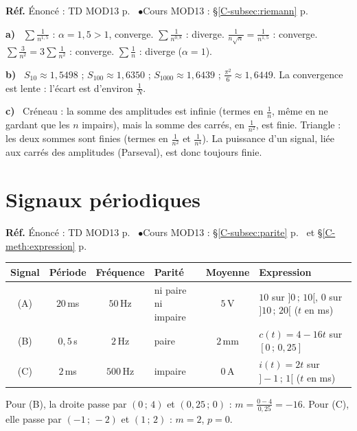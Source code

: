 \documentclass[a4paper,11pt]{article}
\newcommand{\cours}[1]{§\ref{C-#1} p.~\pageref{C-#1}}
\newcommand{\source}[2]{{\footnotesize\color{uimmgray}\textbf{Réf.} \enspace Énoncé : TD MOD13 p.~\pageref{T-#1} \enspace$\bullet$\enspace Cours MOD13 : #2}\par\smallskip}
\newcommand{\q}[1]{\textbf{\color{uimmblue}#1}\ }
\begin{document}
\begin{correction}
\source{exo:3}{\cours{subsec:riemann}}
\q{a)} $\sum\frac1{n^{1{,}5}}$ : $\alpha = 1{,}5 > 1$, converge. \quad $\sum\frac1{n^{0{,}8}}$ : diverge. \quad $\frac1{n\sqrt n} = \frac1{n^{1{,}5}}$ : converge. \quad $\sum\frac3{n^2} = 3\sum\frac1{n^2}$ : converge. \quad $\sum\frac1n$ : diverge ($\alpha = 1$).

\q{b)} $S_{10}\approx 1{,}5498$ ; $S_{100}\approx 1{,}6350$ ; $S_{1000}\approx 1{,}6439$ ; $\frac{\pi^2}{6}\approx 1{,}6449$. La convergence est lente : l'écart est d'environ $\frac1N$.

\q{c)} Créneau : la somme des amplitudes est infinie (termes en $\frac1n$, même en ne gardant que les $n$ impairs), mais la somme des carrés, en $\frac1{n^2}$, est finie. Triangle : les deux sommes sont finies (termes en $\frac1{n^2}$ et $\frac1{n^4}$). La puissance d'un signal, liée aux carrés des amplitudes (Parseval), est donc toujours finie.
\end{correction}

\needspace{8cm}
\section{Signaux périodiques}

\begin{correction}
\source{exo:4}{\cours{subsec:parite} et \cours{meth:expression}}
\begin{center}
\renewcommand{\arraystretch}{1.4}
\begin{tabular}{|c|c|c|p{2.4cm}|c|p{4.8cm}|}
\hline
\rowcolor{uimmlightblue}
Signal & Période & Fréquence & Parité & Moyenne & Expression \\
\hline
(A) & $20$\,ms & $50$\,Hz & ni paire ni impaire & $5$\,V & $10$ sur $]0\,;\,10[$, $0$ sur $]10\,;\,20[$ ($t$ en ms) \\
\hline
(B) & $0{,}5$\,s & $2$\,Hz & paire & $2$\,mm & $c(t) = 4 - 16t$ sur $[0\,;\,0{,}25]$ \\
\hline
(C) & $2$\,ms & $500$\,Hz & impaire & $0$\,A & $i(t) = 2t$ sur $]-1\,;\,1[$ ($t$ en ms) \\
\hline
\end{tabular}
\end{center}
Pour (B), la droite passe par $(0\,;\,4)$ et $(0{,}25\,;\,0)$ : $m = \frac{0-4}{0{,}25} = -16$. Pour (C), elle passe par $(-1\,;\,-2)$ et $(1\,;\,2)$ : $m = 2$, $p = 0$.
\end{correction}
\end{document}
